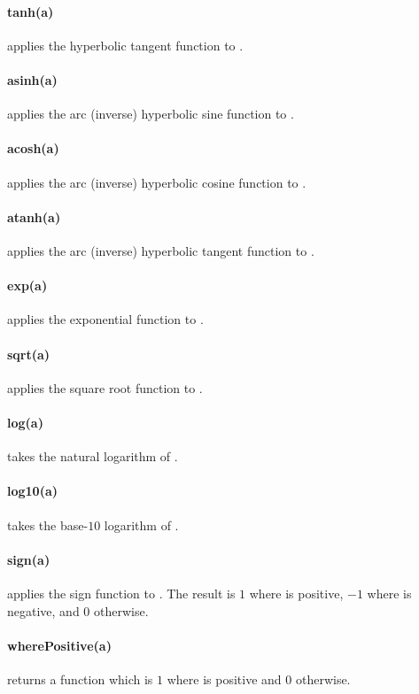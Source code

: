 \paragraph{tanh(a)}
applies the hyperbolic tangent function to .


\paragraph{asinh(a)}
applies the arc (inverse) hyperbolic sine function to .


\paragraph{acosh(a)}
applies the arc (inverse) hyperbolic cosine function to .


\paragraph{atanh(a)}
applies the arc (inverse) hyperbolic tangent function to .


\paragraph{exp(a)}
applies the exponential function to .


\paragraph{sqrt(a)}
applies the square root function to .


\paragraph{log(a)}
takes the natural logarithm of .


\paragraph{log10(a)}
takes the base-$10$ logarithm of .


\paragraph{sign(a)}
applies the sign function to . The result is $1$ where  is
positive, $-1$ where  is negative, and $0$ otherwise.


\paragraph{wherePositive(a)}
returns a function which is $1$ where  is positive and $0$ otherwise.


